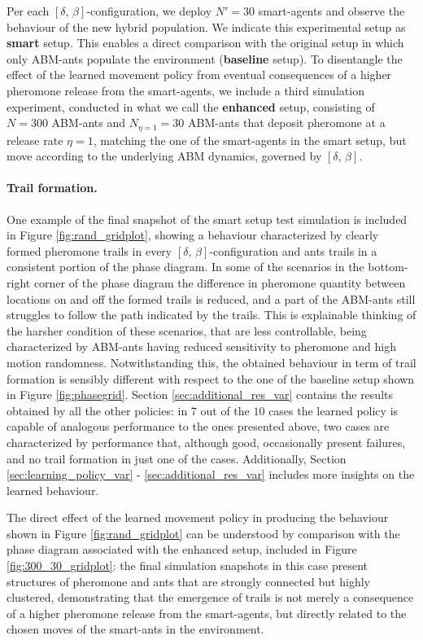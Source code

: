 \documentclass[pdflatex,sn-mathphys-num]{sn-jnl}%
\theoremstyle{thmstyleone}%
\theoremstyle{thmstyletwo}%
\theoremstyle{thmstylethree}%
\begin{document}
Per each $\left[ \delta, \, \beta \right]$-configuration, we deploy $N' = 30$ smart-agents and observe the behaviour of the new hybrid population. We indicate this experimental setup as \textbf{smart} setup. This enables a direct comparison with the original setup in which only ABM-ants populate the environment (\textbf{baseline} setup). To disentangle the effect of the learned movement policy from eventual consequences of a higher pheromone release from the smart-agents, we include a third simulation experiment, conducted in what we call the \textbf{enhanced} setup, consisting of $N=300$ ABM-ants and $N_{\eta=1} = 30$ ABM-ants that deposit pheromone at a release rate $\eta = 1$, matching the one of the smart-agents in the smart setup, but move according to the underlying ABM dynamics, governed by $\left[ \delta, \, \beta \right]$.

\paragraph{Trail formation.}%
One example of the final snapshot of the smart setup test simulation is included in Figure \ref{fig:rand_gridplot}, showing a behaviour characterized by clearly formed pheromone trails in every $\left[ \delta, \, \beta \right]$-configuration and ants trails in a consistent portion of the phase diagram. In some of the scenarios in the bottom-right corner of the phase diagram the difference in pheromone quantity between locations on and off the formed trails is reduced, and a part of the ABM-ants still struggles to follow the path indicated by the trails. This is explainable thinking of the harsher condition of these scenarios, that are less controllable, being characterized by ABM-ants having reduced sensitivity to pheromone and high motion randomness. Notwithstanding this, the obtained behaviour in term of trail formation is sensibly different with respect to the one of the baseline setup shown in Figure \ref{fig:phasegrid}.
Section \ref{sec:additional_res_var} contains the results obtained by all the other policies: in $7$ out of the $10$ cases the learned policy is capable of analogous performance to the ones presented above, two cases are characterized by performance that, although good, occasionally present failures, and no trail formation in just one of the cases. Additionally, Section \ref{sec:learning_policy_var} - \ref{sec:additional_res_var} includes more insights on the learned behaviour.

The direct effect of the learned movement policy in producing the behaviour shown in Figure \ref{fig:rand_gridplot} can be understood by comparison with the phase diagram associated with the enhanced setup, included in Figure \ref{fig:300_30_gridplot}: the final simulation snapshots in this case present structures of pheromone and ants that are strongly connected but highly clustered, demonstrating that the emergence of trails is not merely a consequence of a higher pheromone release from the smart-agents, but directly related to the chosen moves of the smart-ants in the environment.\\
\end{document}
